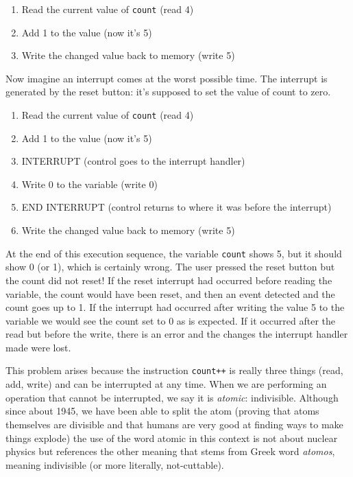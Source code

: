 \documentclass[a4paper]{report}
\begin{document}
\begin{enumerate}
	\item Read the current value of \texttt{count} (read 4)
	\item Add 1 to the value (now it's 5)
	\item Write the changed value back to memory (write 5)
\end{enumerate}

Now imagine an interrupt comes at the worst possible time. The interrupt is generated by the reset button: it's supposed to set the value of count to zero.

\begin{enumerate}
	\item Read the current value of \texttt{count} (read 4)
	\item Add 1 to the value (now it's 5)
	\item INTERRUPT (control goes to the interrupt handler)
	\item Write 0 to the variable (write 0)
	\item END INTERRUPT (control returns to where it was before the interrupt)
	\item Write the changed value back to memory (write 5)
\end{enumerate}

At the end of this execution sequence, the variable \texttt{count} shows 5, but it should show 0 (or 1), which is certainly wrong. The user pressed the reset button but the count did not reset! If the reset interrupt had occurred before reading the variable, the count would have been reset, and then an event detected and the count goes up to 1. If the interrupt had occurred after writing the value 5 to the variable we would see the count set to 0 as is expected. If it occurred after the read but before the write, there is an error and the changes the interrupt handler made were lost.

This problem arises because the instruction \texttt{count++} is really three things (read, add, write) and can be interrupted at any time. When we are performing an operation that cannot be interrupted, we say it is \textit{atomic}: indivisible. Although since about 1945, we have been able to split the atom (proving that atoms themselves are divisible and that humans are very good at finding ways to make things explode) the use of the word atomic in this context is not about nuclear physics but references the other meaning that stems from Greek word \textit{atomos}, meaning indivisible (or more literally, not-cuttable).
\end{document}
